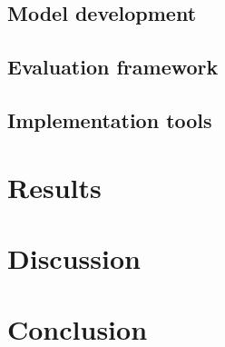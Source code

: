 \documentclass[pdftex,10pt,a4paper,oneside]{article}
\numberwithin{equation}{section}
\begin{document}


\newpage



\newpage



\newpage



\newpage

\subsection*{Model development}


\newpage






\subsection*{Evaluation framework}

\subsection*{Implementation tools}

\newpage

\section{Results}\label{sec:4-results}
\newpage

\section{Discussion}\label{sec:5-discussion}
\newpage

\section{Conclusion}\label{sec:6-conclusion}
\newpage



\newpage


\end{document}
